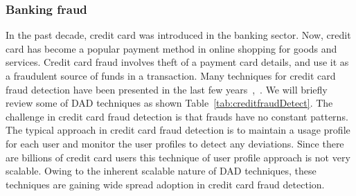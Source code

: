 \subsubsection{Banking fraud}
In the past decade, credit card was introduced in the banking sector. Now, credit card has become a popular
payment method in online shopping for goods and services. Credit card fraud involves theft of a payment card details, and use it as a fraudulent source of funds in a transaction. Many techniques for credit card fraud detection have been presented in the last few years~\cite{zhou2018state},~\cite{suganya2015survey}. We will briefly review some of DAD techniques as shown Table~\ref{tab:creditfraudDetect}.
The challenge in credit card fraud detection is that frauds have no constant patterns. The typical approach in credit card fraud detection is to maintain a usage profile for each user and monitor the user profiles to detect any deviations. Since there are billions of credit card users this technique of user profile approach is not very scalable. Owing to the inherent scalable nature of DAD techniques, these techniques are gaining wide spread adoption in credit card fraud detection.
